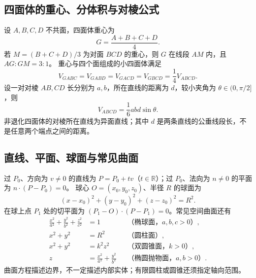 \documentclass[../main.tex]{subfiles}
\begin{document}
\subsection{四面体的重心、分体积与对棱公式}
设 $A,B,C,D$ 不共面，四面体重心为
\[
G=\frac{A+B+C+D}{4}.
\]
若 $M=(B+C+D)/3$ 为对面 $BCD$ 的重心，则 $G$ 在线段 $AM$ 内，且 $AG:GM=3:1$。
重心与四个面组成的小四面体满足
\[
V_{GABC}=V_{GABD}=V_{GACD}=V_{GBCD}=\frac14V_{ABCD}.
\]
设一对对棱 $AB,CD$ 长分别为 $a,b$，所在直线的距离为 $d$，较小夹角为 $\theta\in(0,\pi/2]$，则
\[
V_{ABCD}=\frac16abd\sin\theta.
\]
非退化四面体的对棱所在直线为异面直线；其中 $d$ 是两条直线的公垂线段长，不是任意两个端点之间的距离。
\par\begin{samepage}
\subsection{直线、平面、球面与常见曲面}
过 $P_0$、方向为 $v\ne0$ 的直线为 $P=P_0+tv$（$t\in\mathbb R$）；过 $P_0$、法向为 $n\ne0$ 的平面为 $n\cdot(P-P_0)=0$。
球心 $O=(x_0,y_0,z_0)$、半径 $R$ 的球面为
\[
(x-x_0)^2+(y-y_0)^2+(z-z_0)^2=R^2.
\]
在球上点 $P_1$ 处的切平面为 $(P_1-O)\cdot(P-P_1)=0$。常见空间曲面还有
\begin{align*}
\frac{x^2}{a^2}+\frac{y^2}{b^2}+\frac{z^2}{c^2}&=1 &&\text{（椭球面，}a,b,c>0\text{）},\\
x^2+y^2&=R^2 &&\text{（圆柱面）},\\
x^2+y^2&=k^2z^2 &&\text{（双圆锥面，}k>0\text{）},\\
z&=\frac{x^2}{a^2}+\frac{y^2}{b^2} &&\text{（椭圆抛物面，}a,b>0\text{）}.
\end{align*}
曲面方程描述边界，不一定描述内部实体；有限圆柱或圆锥还须指定轴向范围。
\par\end{samepage}
\end{document}
